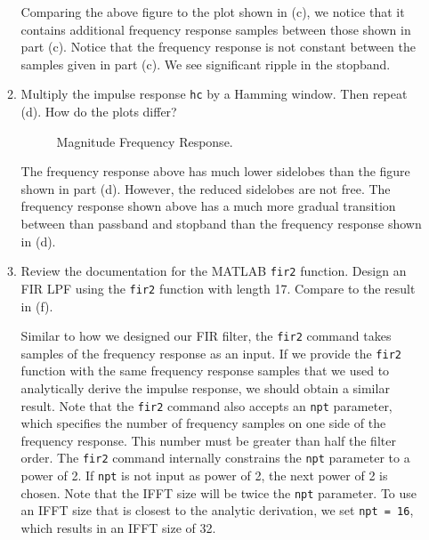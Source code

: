 \documentclass[fleqn]{article}
\begin{document}
\begin{enumerate}
\begin{enumerate}[nolistsep]
			Comparing the above figure to the plot shown in (c), we notice that it contains additional frequency response samples between those shown in part (c). Notice that the frequency response is not constant between the samples given in part (c). We see significant ripple in the stopband.
			
			\item Multiply the impulse response \texttt{hc} by a Hamming window. Then repeat (d). How do the plots differ?
			
			\begin{figure}[H]
				\centerline{}
				\caption{Magnitude Frequency Response.}
			\end{figure}
			
			The frequency response above has much lower sidelobes than the figure shown in part (d). However, the reduced sidelobes are not free. The frequency response shown above has a much more gradual transition between than passband and stopband than the frequency response shown in (d).
			
			\item Review the documentation for the MATLAB \texttt{fir2} function. Design an FIR LPF using the \texttt{fir2} function with length 17. Compare to the result in (f).
			
			Similar to how we designed our FIR filter, the \texttt{fir2} command takes samples of the frequency response as an input. If we provide the \texttt{fir2} function with the same frequency response samples that we used to analytically derive the impulse response, we should obtain a similar result. Note that the \texttt{fir2} command also accepts an \texttt{npt} parameter, which specifies the number of frequency samples on one side of the frequency response. This number must be greater than half the filter order. The \texttt{fir2} command internally constrains the \texttt{npt} parameter to a power of 2. If \texttt{npt} is not input as power of 2, the next power of 2 is chosen. Note that the IFFT size will be twice the \texttt{npt} parameter. To use an IFFT size that is closest to the analytic derivation, we set \texttt{npt = 16}, which results in an IFFT size of 32.
			

\end{enumerate}
\end{enumerate}
\end{document}

